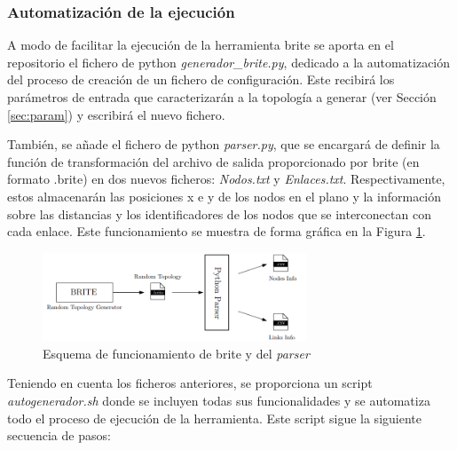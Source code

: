 \subsubsection{Automatización de la ejecución}
\label{sec:brite_eje}

A modo de facilitar la ejecución de la herramienta \gls{brite} se aporta en el repositorio el fichero de python \textit{generador\_brite.py}, dedicado a la automatización del proceso de creación de un fichero de configuración. Este recibirá los parámetros de entrada que caracterizarán a la topología a generar (ver Sección \ref{sec:param}) y escribirá el nuevo fichero.

\vspace{3mm}

También, se añade el fichero de python \textit{parser.py}, que se encargará de definir la función de transformación del archivo de salida proporcionado por \gls{brite} (en formato .brite) en dos nuevos ficheros: \textit{Nodos.txt} y \textit{Enlaces.txt}. Respectivamente, estos almacenarán las posiciones x e y de los nodos en el plano y la información sobre las distancias y los identificadores de los nodos que se interconectan con cada enlace. Este funcionamiento se muestra de forma gráfica en la Figura \ref{fig:parser}.

\vspace{3mm}

\begin{figure}[H]
    \centering
    \includegraphics[width=0.7\textwidth]{img/teoria/parser.png}
    \caption{Esquema de funcionamiento de \acrshort{brite} y del \textit{parser} \cite{den2ne}}
    \label{fig:parser}
\end{figure}

\vspace{3mm}

Teniendo en cuenta los ficheros anteriores, se proporciona un script \textit{autogenerador.sh} donde se incluyen todas sus funcionalidades y se automatiza todo el proceso de ejecución de la herramienta. Este script sigue la siguiente secuencia de pasos:


